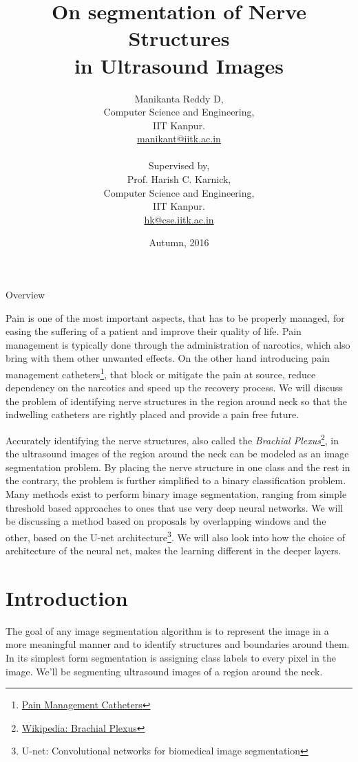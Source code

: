 \documentclass[12pt, a4paper]{article}
\title{
	\vspace{-34mm}
    \fontsize{24pt}{12pt}
    \selectfont\textbf{
    On segmentation of Nerve Structures \\ 
    in Ultrasound Images
    }
} %
\author
{
    Manikanta Reddy D, \\
    Computer Science and Engineering, \\
    IIT Kanpur.\\
    \href{mailto:manikant@iitk.ac.in}{manikant@iitk.ac.in}
    \\
    \\
    Supervised by, \\ 
    Prof. Harish C. Karnick,\\
    Computer Science and Engineering, \\
    IIT Kanpur.\\
    \href{mailto:hk@cse.iitk.ac.in}{hk@cse.iitk.ac.in}
} %
\date{\Large Autumn, 2016}
\begin{document}
\maketitle %
\begin{center}
\LARGE Overview
\end{center}
Pain is one of the most important aspects, that has to be properly managed, for easing the suffering of a patient and improve their quality of life. Pain management is typically done through the administration of narcotics, which also bring with them other unwanted effects. On the other hand introducing pain management catheters\footnote{\href{https://www.med.umich.edu/1libr/Anesthesiology/PeripheralNerveCatheterWhatIstIt.pdf}{Pain Management Catheters}}, that block or mitigate the pain at source, reduce dependency on the narcotics and speed up the recovery process. We will discuss the problem of identifying nerve structures in the region around neck so that the indwelling catheters are rightly placed and provide a pain free future. 

Accurately identifying the nerve structures, also called the \emph{Brachial Plexus}\footnote{\href{https://en.wikipedia.org/wiki/Brachial_plexus}{Wikipedia: Brachial Plexus}}, in the ultrasound images of the region around the neck can be modeled as an image segmentation problem. By placing the nerve structure in one class and the rest in the contrary, the problem is further simplified to a binary classification problem. Many methods exist to perform binary image segmentation, ranging from simple threshold based approaches to ones that use very deep neural networks. We will be discussing a method based on proposals by overlapping windows and the other, based on the U-net architecture\footnote{U-net: Convolutional networks for biomedical image segmentation\cite{ronneberger2015u}}. We will also look into how the choice of architecture of the neural net, makes the learning different in the deeper layers.  
\newpage
\tableofcontents
\newpage
\thispagestyle{fancy}
\section{Introduction}
The goal of any image segmentation algorithm is to represent the image in a more meaningful manner and to identify structures and boundaries around them. In its simplest form segmentation is assigning class labels to every pixel in the image. We'll be segmenting ultrasound images of a region around the neck.
\end{document}
